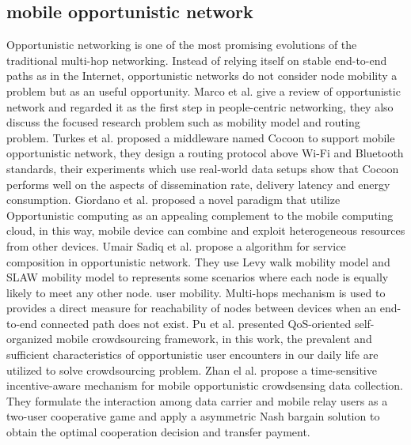 \documentclass[10pt,journal,compsoc]{IEEEtran}
\begin{document}
\subsection{mobile opportunistic network}
Opportunistic networking is one of the most promising evolutions of the traditional multi-hop networking. 
Instead of relying itself on stable end-to-end paths as in the Internet, opportunistic networks do not consider node mobility a problem but as an useful opportunity. 
Marco et al. \cite{Conti2014} give a review of opportunistic network and regarded it as the first step in people-centric networking, they also discuss the focused research problem such as mobility model and routing problem.
Turkes et al. \cite{turkes2016cocoon} proposed a middleware named Cocoon to support mobile opportunistic network, they design a routing protocol above Wi-Fi and Bluetooth standards, their experiments which use real-world data setups show that Cocoon performs well on the aspects of dissemination rate, delivery latency and energy consumption.
Giordano et al. \cite{giordano2011human} proposed a novel paradigm that utilize Opportunistic computing as an appealing complement to the mobile computing cloud, in this way, mobile device can combine and exploit heterogeneous resources from other devices.
Umair Sadiq et al. \cite{sadiq2015service} propose a algorithm for service composition in opportunistic network. They use Levy walk mobility model and SLAW mobility model to represents some scenarios where each node is equally likely to meet any other node. user mobility. Multi-hops mechanism is used to provides a direct measure for reachability of nodes between devices when an end-to-end connected path does not exist.
Pu et al. \cite{Pu2017crowd} presented QoS-oriented self-organized mobile crowdsourcing framework, in this work, the prevalent and sufficient characteristics of opportunistic user encounters in our daily life are utilized to solve crowdsourcing problem.
Zhan el al. \cite{zhan2017time} propose a time-sensitive incentive-aware mechanism for mobile opportunistic crowdsensing data collection. They formulate the interaction among data carrier and mobile relay users as a two-user cooperative game and apply a asymmetric Nash bargain solution to obtain the optimal cooperation decision and transfer payment.
\end{document}
